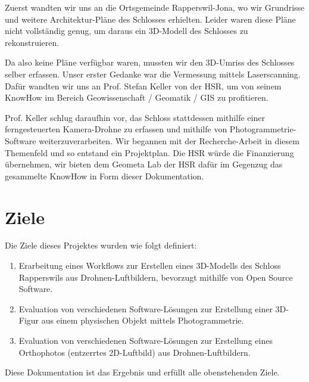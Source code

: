 Zuerst wandten wir uns an die Ortsgemeinde Rapperswil-Jona, wo wir Grundrisse
und weitere Architektur-Pläne des Schlosses erhielten. Leider waren diese Pläne
nicht vollständig genug, um daraus ein 3D-Modell des Schlosses zu rekonstruieren.

Da also keine Pläne verfügbar waren, mussten wir den 3D-Umriss des Schlosses
selber erfassen. Unser erster Gedanke war die Vermessung mittels Laserscanning.
Dafür wandten wir uns an Prof. Stefan Keller von der HSR, um von seinem KnowHow
im Bereich Geowissenschaft / Geomatik / GIS zu profitieren.

Prof. Keller schlug daraufhin vor, das Schloss stattdessen mithilfe einer
ferngesteuerten Kamera-Drohne zu erfassen und mithilfe von
Photogrammetrie-Software weiterzuverarbeiten. Wir begannen mit der
Recherche-Arbeit in diesem Themenfeld und so entstand ein Projektplan. Die HSR
würde die Finanzierung übernehmen, wir bieten dem Geometa Lab der HSR dafür im
Gegenzug das gesammelte KnowHow in Form dieser Dokumentation.


\section{Ziele}\label{sec:goals}

Die Ziele dieses Projektes wurden wie folgt definiert:

\begin{enumerate}
	\item Erarbeitung eines Workflows zur Erstellen eines 3D-Modells des Schloss
		Rapperswils aus Drohnen-Luftbildern, bevorzugt mithilfe von Open Source
		Software.
	\item Evaluation von verschiedenen Software-Lösungen zur Erstellung einer
		3D-Figur aus einem physischen Objekt mittels Photogrammetrie.
	\item Evaluation von verschiedenen Software-Lösungen zur Erstellung eines
		Orthophotos (entzerrtes 2D-Luftbild) aus Drohnen-Luftbildern.
\end{enumerate}

Diese Dokumentation ist das Ergebnis und erfüllt alle obenstehenden Ziele.
